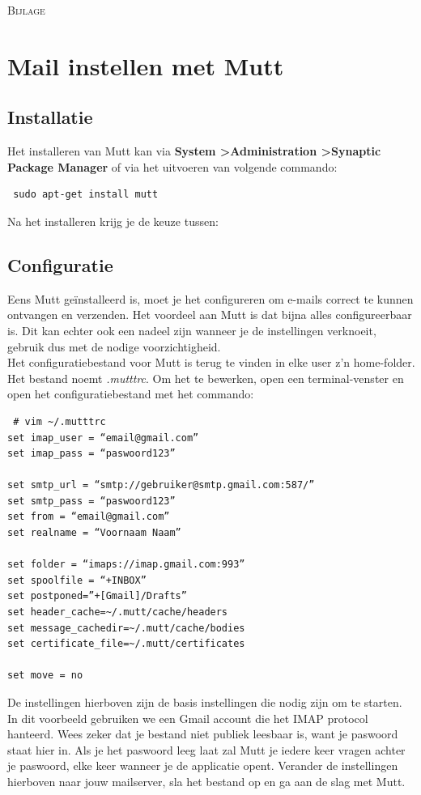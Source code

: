 \documentclass[12pt]{article} %
\begin{document}
\newpage

\textsc{\Large Bijlage}
\section{Mail instellen met Mutt} \label{sec:Mail instellen met Mutt}

\subsection{Installatie} \label{sec:Installatie}

Het installeren van Mutt kan via \textbf{System \textgreater \space Administration \textgreater \space Synaptic Package Manager} of
via het uitvoeren van volgende commando:
\begin{lstlisting}
 sudo apt-get install mutt
\end{lstlisting}
Na het installeren krijg je de keuze tussen:

\subsection{Configuratie} \label{sec:Configuratie}

Eens Mutt ge\"installeerd is, moet je het configureren om e-mails correct te kunnen ontvangen en verzenden.
Het voordeel aan Mutt is dat bijna alles configureerbaar is. Dit kan echter ook een nadeel zijn wanneer je de instellingen verknoeit, gebruik dus met de nodige voorzichtigheid.
\\

Het configuratiebestand voor Mutt is terug te vinden in elke user z'n home-folder. Het bestand noemt \textit{.mutttrc}.
Om het te bewerken, open een terminal-venster en open het configuratiebestand met het commando:
\begin{lstlisting}
 # vim ~/.mutttrc
set imap_user = “email@gmail.com”
set imap_pass = “paswoord123”

set smtp_url = “smtp://gebruiker@smtp.gmail.com:587/”
set smtp_pass = “paswoord123”
set from = “email@gmail.com”
set realname = “Voornaam Naam”

set folder = “imaps://imap.gmail.com:993”
set spoolfile = “+INBOX”
set postponed=”+[Gmail]/Drafts”
set header_cache=~/.mutt/cache/headers
set message_cachedir=~/.mutt/cache/bodies
set certificate_file=~/.mutt/certificates

set move = no
\end{lstlisting}
De instellingen hierboven zijn de basis instellingen die nodig zijn om te starten.
In dit voorbeeld gebruiken we een Gmail account die het IMAP protocol hanteerd.
Wees zeker dat je bestand niet publiek leesbaar is, want je paswoord staat hier in.
Als je het paswoord leeg laat zal Mutt je iedere keer vragen achter je paswoord, elke keer wanneer je de applicatie opent.
Verander de instellingen hierboven naar jouw mailserver, sla het bestand op en ga aan de slag met Mutt.
\end{document}
